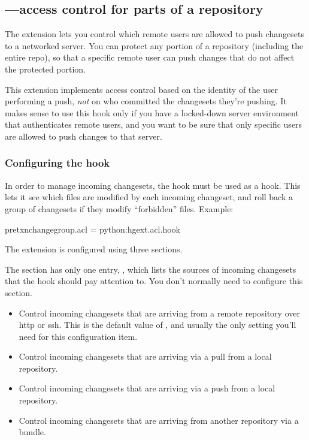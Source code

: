 \subsection{---access control for parts of a repository}

The  extension lets you control which remote users are
allowed to push changesets to a networked server.  You can protect any
portion of a repository (including the entire repo), so that a
specific remote user can push changes that do not affect the protected
portion.

This extension implements access control based on the identity of the
user performing a push, \emph{not} on who committed the changesets
they're pushing.  It makes sense to use this hook only if you have a
locked-down server environment that authenticates remote users, and
you want to be sure that only specific users are allowed to push
changes to that server.

\subsubsection{Configuring the  hook}

In order to manage incoming changesets, the  hook must be
used as a  hook.  This lets it see which files
are modified by each incoming changeset, and roll back a group of
changesets if they modify ``forbidden'' files.  Example:
\begin{codesample2}
  [hooks]
  pretxnchangegroup.acl = python:hgext.acl.hook
\end{codesample2}

The  extension is configured using three sections.  

The  section has only one entry, ,
which lists the sources of incoming changesets that the hook should
pay attention to.  You don't normally need to configure this section.
\begin{itemize}
\item[\rcitem{acl}{serve}] Control incoming changesets that are arriving
  from a remote repository over http or ssh.  This is the default
  value of , and usually the only setting you'll
  need for this configuration item.
\item[\rcitem{acl}{pull}] Control incoming changesets that are
  arriving via a pull from a local repository.
\item[\rcitem{acl}{push}] Control incoming changesets that are
  arriving via a push from a local repository.
\item[\rcitem{acl}{bundle}] Control incoming changesets that are
  arriving from another repository via a bundle.
\end{itemize}

